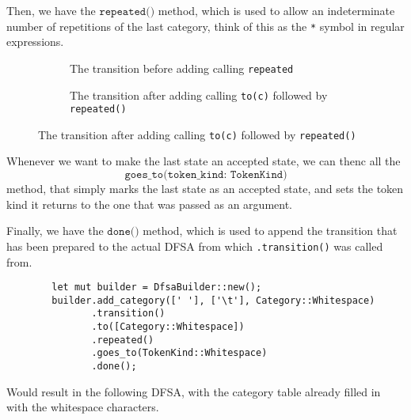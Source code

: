 \documentclass{article}
\newcommand{\code}[1]{\texttt{#1}}
\begin{document}
Then, we have the $\code{repeated()}$ method, which is used to allow an
indeterminate number of repetitions of the last category, think of this as the
\code{*} symbol in regular expressions.

\begin{figure}[H]
    \begin{subfigure}[t]{0.5\textwidth}
        \centering
        \caption{The transition before adding calling \code{repeated}}
    \end{subfigure}
    \begin{subfigure}[t]{0.5\textwidth}
        \centering
        \caption{The transition after adding calling \code{to(c)} followed by  \code{repeated()}}
    \end{subfigure}
\end{figure}


Whenever we want to make the last state an accepted state, we can thenc all the
$$\code{goes\_to(token\_kind: TokenKind)}$$ method, that simply marks the last state as
an accepted state, and sets the token kind it returns to the one that was passed
as an argument.

Finally, we have the $\code{done()}$ method, which is used to append the transition that has been prepared to the actual DFSA from which \code{.transition()} was called from.


\begin{mainbox}{}
    \lstset{xleftmargin=1cm, aboveskip=0pt, belowskip=0pt}
    \begin{lstlisting}
        let mut builder = DfsaBuilder::new();
        builder.add_category([' '], ['\t'], Category::Whitespace)
               .transition()
               .to([Category::Whitespace])
               .repeated()
               .goes_to(TokenKind::Whitespace)
               .done();
    \end{lstlisting}
\end{mainbox}

Would result in the following DFSA, with the category table already filled in
with the whitespace characters.
\end{document}
